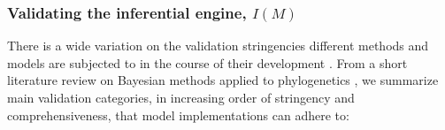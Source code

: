\documentclass[oneside]{article}
\begin{document}

\subsubsection*{Validating the inferential engine, $I(M)$}

There is a wide variation on the validation stringencies different
methods and models are subjected to in the course of their
development \citep{darriba18}.
From a short literature review on Bayesian methods applied to
phylogenetics {\color{red}{(Table X)}}, we summarize {\color{red}{three [could be more
    after literature review]}} main validation categories,
in increasing order of stringency and comprehensiveness,
that model implementations can adhere to:
\end{document}
